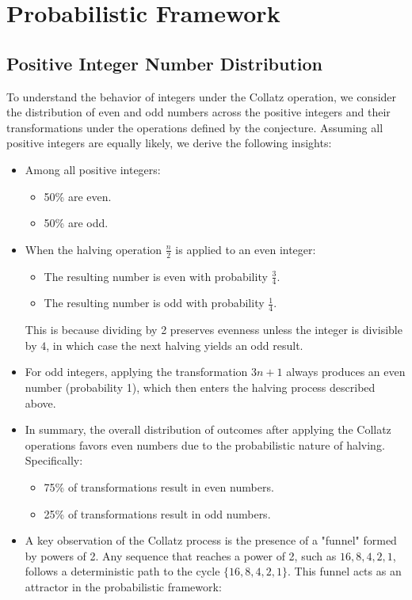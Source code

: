 \section{Probabilistic Framework}
\subsection{Positive Integer Number Distribution}
To understand the behavior of integers under the Collatz operation, we consider the distribution of even and odd numbers across the positive integers and their transformations under the operations defined by the conjecture. Assuming all positive integers are equally likely, we derive the following insights:

\begin{itemize}
    \item Among all positive integers:
    \begin{itemize}
        \item 50\% are even.
        \item 50\% are odd.
    \end{itemize}
    \item When the halving operation \( \frac{n}{2} \) is applied to an even integer:
    \begin{itemize}
        \item The resulting number is even with probability \( \frac{3}{4} \).
        \item The resulting number is odd with probability \( \frac{1}{4} \).
    \end{itemize}
    This is because dividing by 2 preserves evenness unless the integer is divisible by \( 4 \), in which case the next halving yields an odd result.
    \item For odd integers, applying the transformation \( 3n+1 \) always produces an even number (probability 1), which then enters the halving process described above.
    \item In summary, the overall distribution of outcomes after applying the Collatz operations favors even numbers due to the probabilistic nature of halving. Specifically:
    \begin{itemize}
        \item 75\% of transformations result in even numbers.
        \item 25\% of transformations result in odd numbers.
    \end{itemize}
    \item A key observation of the Collatz process is the presence of a "funnel" formed by powers of 2. Any sequence that reaches a power of 2, such as \( 16, 8, 4, 2, 1 \), follows a deterministic path to the cycle \( \{16, 8, 4, 2, 1\} \). This funnel acts as an attractor in the probabilistic framework:

\end{itemize}
